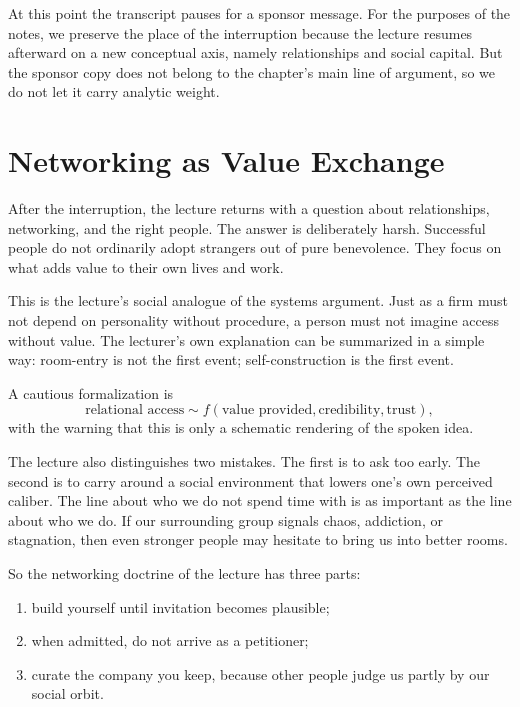 At this point the transcript pauses for a sponsor message. For the purposes of the notes, we preserve the place of the interruption because the lecture resumes afterward on a new conceptual axis, namely relationships and social capital. But the sponsor copy does not belong to the chapter's main line of argument, so we do not let it carry analytic weight.

\section{Networking as Value Exchange}

After the interruption, the lecture returns with a question about relationships, networking, and the right people. The answer is deliberately harsh. Successful people do not ordinarily adopt strangers out of pure benevolence. They focus on what adds value to their own lives and work.

This is the lecture's social analogue of the systems argument. Just as a firm must not depend on personality without procedure, a person must not imagine access without value. The lecturer's own explanation can be summarized in a simple way: room-entry is not the first event; self-construction is the first event.

A cautious formalization is
\begin{equation}
\text{relational access} \sim f(\text{value provided},\text{credibility},\text{trust}),
\end{equation}
with the warning that this is only a schematic rendering of the spoken idea.

The lecture also distinguishes two mistakes. The first is to ask too early. The second is to carry around a social environment that lowers one's own perceived caliber. The line about who we do not spend time with is as important as the line about who we do. If our surrounding group signals chaos, addiction, or stagnation, then even stronger people may hesitate to bring us into better rooms.

So the networking doctrine of the lecture has three parts:
\begin{enumerate}
\item build yourself until invitation becomes plausible;
\item when admitted, do not arrive as a petitioner;
\item curate the company you keep, because other people judge us partly by our social orbit.
\end{enumerate}

